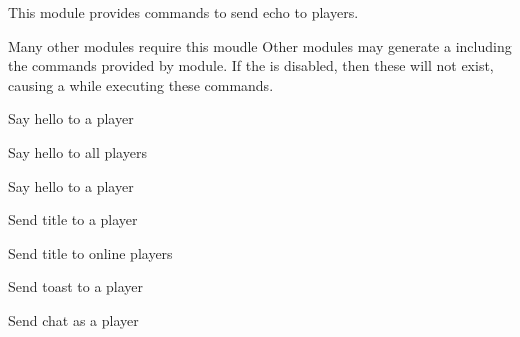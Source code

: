 This module provides commands to send echo to players.

\begin{note}{Many other modules require this moudle}
    Other modules may generate a  including the commands provided by  module.
    If the  is disabled, then these  will not exist, causing a  while executing these commands.
\end{note}


\begin{example}{Say hello to a player}
\end{example}


\begin{example}{Say hello to all players}
\end{example}


\begin{example}{Say hello to a player}
\end{example}

\begin{example}{Send title to a player}
\end{example}

\begin{example}{Send title to online players}
\end{example}

\begin{example}{Send toast to a player}
\end{example}


\begin{example}{Send chat as a player}
\end{example}

